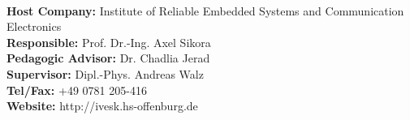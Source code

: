 \\
\textbf{\large{Host Company:}} Institute of Reliable Embedded Systems and Communication Electronics \\
\textbf{\large{Responsible:}} Prof. Dr.-Ing. Axel Sikora\\
\textbf{\large{Pedagogic Advisor:}} Dr. Chadlia Jerad \\
\textbf{\large{Supervisor:}} Dipl.-Phys. Andreas Walz\\
\textbf{\large{Tel/Fax:}} +49 0781 205-416\\
\textbf{\large{Website:}} http://ivesk.hs-offenburg.de \\
